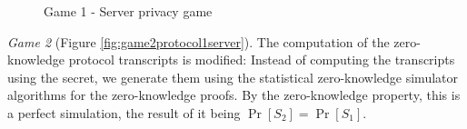 \begin{figure}[htbp!] 
  \centering
  \caption{Game 1 - Server privacy game}
  \label{fig:game1protocol1server}
\end{figure}

\textit{Game 2} (Figure \ref{fig:game2protocol1server}). The computation of the
zero-knowledge protocol transcripts is modified: Instead of computing the
transcripts using the secret, we generate them using the statistical
zero-knowledge simulator algorithms for the zero-knowledge proofs. By the
zero-knowledge property, this is a perfect simulation, the result of it being
$\Pr[S_2]= \Pr[S_1]$.

